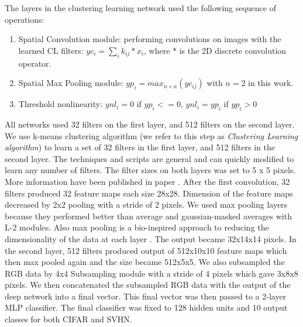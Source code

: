 \documentclass{article} %
\begin{document}
The layers in the clustering learning network used the following sequence of operations:
\begin{enumerate}
\item Spatial Convolution module: performing convolutions on images with the learned CL filters: $yc_i=\sum_i{k_{ij}\ast x_i}$, where $\ast$ is the 2D discrete convolution operator.
\item Spatial Max Pooling module: $yp_i = max_{n \times n}(yc_{ij})$ with $n =  2$ in this work.
\item Threshold nonlinearity: $ynl_i = 0$ if $yp_i <= 0$, $ynl_i = yp_i$ if $yp_i > 0$
\end{enumerate}

All networks used 32 filters on the first layer, and 512 filters on the second layer. We use k-means clustering algorithm (we refer to this step as \textit{Clustering Learning algorithm}) to learn a set of 32 filters in the first layer, and 512 filters in the second layer. The techniques and scripts are general and can quickly modified to learn any number of filters. The filter sizes on both layers was set to 5 x 5 pixels. More information have been published in paper \cite {culurciello2013clustering}. After the first convolution, 32 filters produced 32 feature maps each size 28x28. Dimension of the feature maps decreased by 2x2 pooling with a stride of 2 pixels. We used max pooling layers because they performed better than average and gaussian-masked averages with L-2 modules. Also max pooling is a bio-inspired approach to reducing the dimensionality of the data at each layer \cite{lampl2004intracellular}. The output became 32x14x14 pixels. In the second layer, 512 filters produced output of 512x10x10 feature maps which then max pooled again and the size became 512x5x5. 
We also subsampled the RGB data by 4x4 Subsampling module with a stride of 4 pixels which gave 3x8x8 pixels.  We then concatenated the subsampled RGB data with the output of the deep network into a final vector. This final vector was then passed to a 2-layer MLP classifier. The final classifier was fixed to 128 hidden units and 10 output classes for both CIFAR and SVHN.


\end{document}
